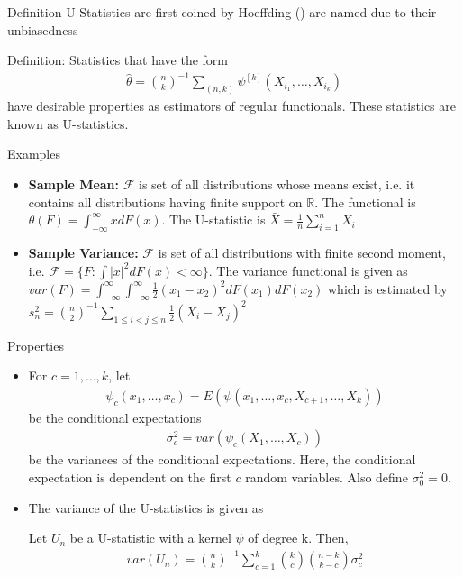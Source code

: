 \documentclass{beamer}
\begin{document}
\begin{frame}{Definition}
U-Statistics are first coined by Hoeffding (\cite{hoeffding1992class}) are named due to their unbiasedness
\begin{block}{Definition:}
Statistics that have the form
        \begin{align}
        \hat{\theta} = {n \choose k}^{-1} \sum_{(n,k)} \psi^{[k]}(X_{i_1}, \dotsc, X_{i_k})
    \end{align} 
have desirable properties as estimators of regular functionals. These statistics are known as U-statistics. 
\end{block}
\end{frame}
\begin{frame}{Examples}
\begin{itemize}
    \item \textbf{Sample Mean:} $\mathcal{F}$ is set of all distributions whose means exist, i.e. it contains all distributions having finite support on $\mathbb{R}$. The functional is $\theta(F) = \int_{-\infty}^{\infty} x dF(x)$. The U-statistic is $\bar{X} = \frac{1}{n}\sum_{i=1}^n X_i$
    \item \textbf{Sample Variance:} $\mathcal{F}$ is set of all distributions with finite second moment, i.e. $\mathcal{F} =\{F: \int|x|^2 dF(x)<\infty\}$. The variance functional is given as $var(F) = \int_{-\infty}^{\infty} \int_{-\infty}^{\infty} \frac{1}{2}(x_1 - x_2)^2dF(x_1)dF(x_2)$ which is estimated by $s_n^2 = {n \choose 2}^{-1}\sum_{1\leq i <j \leq n}\frac{1}{2}(X_i - X_j)^2$
\end{itemize}
\end{frame}
\begin{frame}{Properties}
\begin{itemize}
    \item For $c = 1, \dotsc, k$, let \begin{align}
            \psi_c(x_1, \dotsc, x_c) = E(\psi(x_1, \dotsc, x_c, X_{c+1}, \dotsc, X_k))
        \end{align}
        be the conditional expectations \begin{align}
        \sigma_c^2 = var(\psi_c(X_1, \dotsc, X_c))
        \end{align} 
        be the variances of the conditional expectations.
        Here, the conditional expectation is dependent on the first $c$ random variables. Also define $\sigma_0^2 = 0$. 
        \item The variance of the U-statistics is given as 
    \begin{theorem}
    Let $U_n$ be a U-statistic with a kernel $\psi$ of degree k. Then, 
    \begin{align}
        var(U_n) = {n \choose k}^{-1}\sum_{c=1}^k{k \choose c}{n-k \choose k-c} \sigma_c^2
    \end{align}
    \end{theorem}
    
\end{itemize}
\end{frame}
\end{document}
